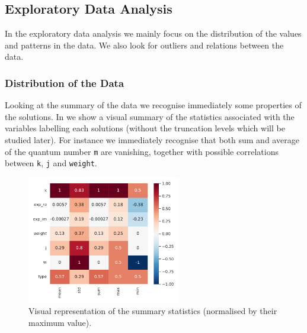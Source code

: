 \subsection{Exploratory Data Analysis}

In the exploratory data analysis we mainly focus on the distribution of the values and patterns in the data.
We also look for outliers and relations between the data.


\subsubsection{Distribution of the Data}

Looking at the summary of the data we recognise immediately some properties of the solutions.
In  we show a visual summary of the statistics associated with the variables labelling each solutions (without the truncation levels which will be studied later).\footnotemark{}
For instance we immediately recognise that both sum and average of the quantum number \texttt{m} are vanishing, together with possible correlations between \texttt{k}, \texttt{j} and \texttt{weight}.\footnotemark{}

\begin{figure}[htbp]
  \centering
  \includegraphics[width=0.6\textwidth]{img/oth_nodup_summary_norm}
  \caption{Visual representation of the summary statistics (normalised by their maximum value).}
  \label{fig:wzw:summary}
\end{figure}

